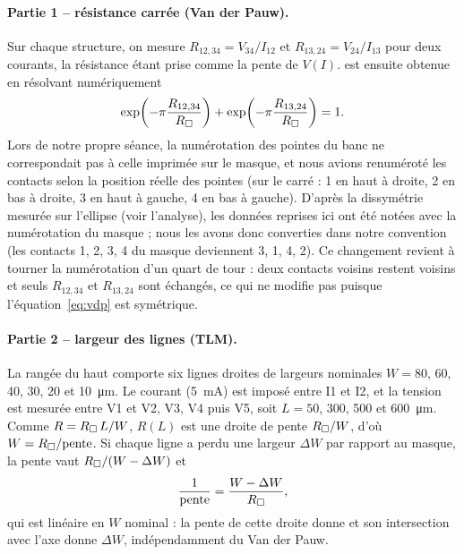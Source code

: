 \paragraph{Partie 1 -- résistance carrée (Van der Pauw).}
Sur chaque structure, on mesure $R_{12,34} = V_{34}/I_{12}$ et $R_{13,24} = V_{24}/I_{13}$ pour deux courants, la résistance étant prise comme la pente de $V(I)$. \Rsq{} est ensuite obtenue en résolvant numériquement
\begin{equation}
  \exp\!\left(-\pi \frac{R_{12,34}}{R_{\square}}\right) + \exp\!\left(-\pi \frac{R_{13,24}}{R_{\square}}\right) = 1 .
  \label{eq:vdp}
\end{equation}
Lors de notre propre séance, la numérotation des pointes du banc ne correspondait pas à celle imprimée sur le masque, et nous avions renuméroté les contacts selon la position réelle des pointes (sur le carré : 1 en haut à droite, 2 en bas à droite, 3 en haut à gauche, 4 en bas à gauche). D'après la dissymétrie mesurée sur l'ellipse (voir l'analyse), les données reprises ici ont été notées avec la numérotation du masque ; nous les avons donc converties dans notre convention (les contacts 1, 2, 3, 4 du masque deviennent 3, 1, 4, 2). Ce changement revient à tourner la numérotation d'un quart de tour : deux contacts voisins restent voisins et seuls $R_{12,34}$ et $R_{13,24}$ sont échangés, ce qui ne modifie pas \Rsq{} puisque l'équation~\eqref{eq:vdp} est symétrique.

\paragraph{Partie 2 -- largeur des lignes (TLM).}
La rangée du haut comporte six lignes droites de largeurs nominales $W = 80$, 60, 40, 30, 20 et \qty{10}{\micro\metre}. Le courant (\qty{5}{\milli\ampere}) est imposé entre I1 et I2, et la tension est mesurée entre V1 et V2, V3, V4 puis V5, soit $L = 50$, 300, 500 et \qty{600}{\micro\metre}. Comme $R = R_{\square}\,L/W$, $R(L)$ est une droite de pente $R_{\square}/W$, d'où $W = R_{\square}/\text{pente}$. Si chaque ligne a perdu une largeur $\Delta W$ par rapport au masque, la pente vaut $R_{\square}/(W - \Delta W)$ et
\begin{equation}
  \frac{1}{\text{pente}} = \frac{W - \Delta W}{R_{\square}} ,
  \label{eq:tlm}
\end{equation}
qui est linéaire en $W$ nominal : la pente de cette droite donne \Rsq{} et son intersection avec l'axe donne $\Delta W$, indépendamment du Van der Pauw.

